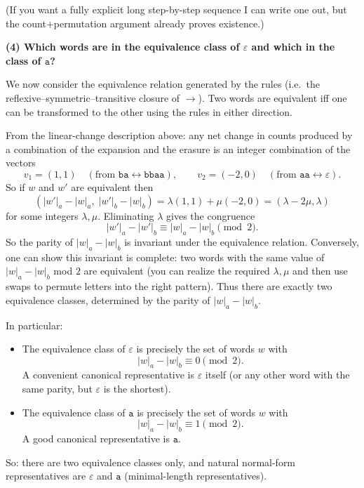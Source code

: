 \documentclass[12pt]{article}
\begin{document}
(If you want a fully explicit long step-by-step sequence I can write one out, but the count+permutation argument already proves existence.)

\bigskip

\textbf{(4) Which words are in the equivalence class of \(\varepsilon\) and which in the class of \(\texttt{a}\)?}

We now consider the equivalence relation generated by the rules (i.e.\ the reflexive–symmetric–transitive closure of \(\to\)). Two words are equivalent iff one can be transformed to the other using the rules in either direction.

From the linear-change description above: any net change in counts produced by a combination of the expansion and the erasure is an integer combination of the vectors
\[
v_1=(1,1)\quad(\text{from }\texttt{ba}\leftrightarrow\texttt{bbaa}),\qquad
v_2=(-2,0)\quad(\text{from }\texttt{aa}\leftrightarrow\varepsilon).
\]
So if \(w\) and \(w'\) are equivalent then
\[
(|w'|_a-|w|_a,\;|w'|_b-|w|_b)=\lambda(1,1)+\mu(-2,0)=(\lambda-2\mu,\lambda)
\]
for some integers \(\lambda,\mu\). Eliminating \(\lambda\) gives the congruence
\[
|w'|_a - |w'|_b \equiv |w|_a - |w|_b \pmod{2}.
\]
So the parity of \(|w|_a-|w|_b\) is invariant under the equivalence relation. Conversely, one can show this invariant is complete: two words with the same value of \(|w|_a-|w|_b\) mod \(2\) are equivalent (you can realize the required \(\lambda,\mu\) and then use swaps to permute letters into the right pattern). Thus there are exactly two equivalence classes, determined by the parity of \(|w|_a-|w|_b\).

In particular:
\begin{itemize}
  \item The equivalence class of \(\varepsilon\) is precisely the set of words \(w\) with
  \[
  |w|_a - |w|_b \equiv 0 \pmod{2}.
  \]
  A convenient canonical representative is \(\varepsilon\) itself (or any other word with the same parity, but \(\varepsilon\) is the shortest).
  \item The equivalence class of \(\texttt{a}\) is precisely the set of words \(w\) with
  \[
  |w|_a - |w|_b \equiv 1 \pmod{2}.
  \]
  A good canonical representative is \(\texttt{a}\).
\end{itemize}

So: there are two equivalence classes only, and natural normal-form representatives are \(\varepsilon\) and \(\texttt{a}\) (minimal-length representatives).

\bigskip
\end{document}
